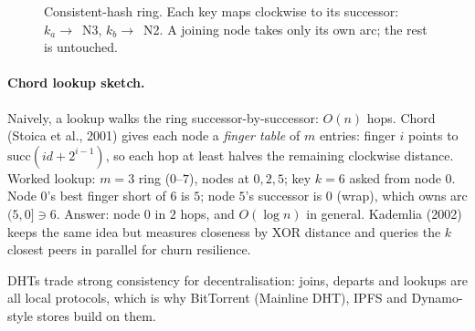 \begin{figure}[h]\centering
{}
\caption{Consistent-hash ring. Each key maps clockwise to its successor: $k_a\to$~N3, $k_b\to$~N2. A joining node takes only its own arc; the rest is untouched.}
\label{fig:hash-ring}
\end{figure}

\paragraph{Chord lookup sketch.} Naively, a lookup walks the ring
successor-by-successor: $O(n)$ hops. Chord (Stoica et al., 2001) gives each
node a \emph{finger table} of $m$ entries: finger $i$ points to
$\mathrm{succ}(id+2^{i-1})$, so each hop at least halves the remaining
clockwise distance. Worked lookup: $m=3$ ring ($0$--$7$), nodes at $0,2,5$;
key $k=6$ asked from node $0$. Node $0$'s best finger short of $6$ is $5$;
node $5$'s successor is $0$ (wrap), which owns arc $(5,0]\ni 6$. Answer:
node $0$ in $2$ hops, and $O(\log n)$ in general. Kademlia (2002) keeps the
same idea but measures closeness by XOR distance and queries the $k$
closest peers in parallel for churn resilience.

DHTs trade strong consistency for decentralisation: joins, departs and
lookups are all local protocols, which is why BitTorrent (Mainline DHT),
IPFS and Dynamo-style stores build on them.

